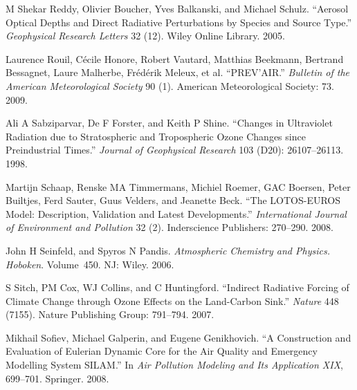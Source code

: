 \documentclass[9pt]{report}
\begin{document}
{\begin{thebibliography}{34}
M Shekar Reddy, Olivier Boucher, Yves Balkanski, and Michael Schulz. \textquotedblleft{}Aerosol Optical Depths and Direct Radiative Perturbations by Species and Source Type.\textquotedblright{} \emph{Geophysical Research Letters} 32 (12). Wiley Online Library. 2005.\label{reddy2005aerosol}%

Laurence Rouil, C\'{e}cile Honore, Robert Vautard, Matthias Beekmann, Bertrand Bessagnet, Laure Malherbe, Fr\'{e}d\'{e}rik Meleux, et al. \textquotedblleft{}PREV’AIR.\textquotedblright{} \emph{Bulletin of the American Meteorological Society} 90 (1). American Meteorological Society: 73. 2009.\label{rouil2009prev}%

Ali A Sabziparvar, De F Forster, and Keith P Shine. \textquotedblleft{}Changes in Ultraviolet Radiation due to Stratospheric and Tropospheric Ozone Changes since Preindustrial Times.\textquotedblright{} \emph{Journal of Geophysical Research} 103 (D20): 26107–26113. 1998.\label{sabziparvar1998changes}%

Martijn Schaap, Renske MA Timmermans, Michiel Roemer, GAC Boersen, Peter Builtjes, Ferd Sauter, Guus Velders, and Jeanette Beck. \textquotedblleft{}The LOTOS-EUROS Model: Description, Validation and Latest Developments.\textquotedblright{} \emph{International Journal of Environment and Pollution} 32 (2). Inderscience Publishers: 270–290. 2008.\label{schaap2008lotos}%

John H Seinfeld, and Spyros N Pandis. \emph{Atmospheric Chemistry and Physics. Hoboken}. Volume 450. NJ: Wiley. 2006.\label{seinfeld2006atmospheric}%

S Sitch, PM Cox, WJ Collins, and C Huntingford. \textquotedblleft{}Indirect Radiative Forcing of Climate Change through Ozone Effects on the Land-Carbon Sink.\textquotedblright{} \emph{Nature} 448 (7155). Nature Publishing Group: 791–794. 2007.\label{sitch2007indirect}%

Mikhail Sofiev, Michael Galperin, and Eugene Genikhovich. \textquotedblleft{}A Construction and Evaluation of Eulerian Dynamic Core for the Air Quality and Emergency Modelling System SILAM.\textquotedblright{} In \emph{Air Pollution Modeling and Its Application XIX}, 699–701. Springer. 2008.\label{sofiev2008construction}%


\end{thebibliography}}
\end{document}

